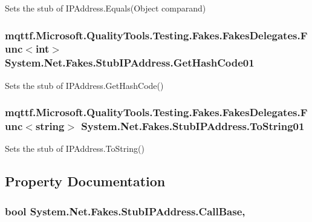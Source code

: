Sets the stub of I\-P\-Address.\-Equals(\-Object comparand)

\hypertarget{class_system_1_1_net_1_1_fakes_1_1_stub_i_p_address_aceba873e006477af4e2333d71b3bee35}{
\subsubsection[{Get\-Hash\-Code01}]{\setlength{\rightskip}{0pt plus 5cm}mqttf.\-Microsoft.\-Quality\-Tools.\-Testing.\-Fakes.\-Fakes\-Delegates.\-Func$<$int$>$ System.\-Net.\-Fakes.\-Stub\-I\-P\-Address.\-Get\-Hash\-Code01}}\label{class_system_1_1_net_1_1_fakes_1_1_stub_i_p_address_aceba873e006477af4e2333d71b3bee35}


Sets the stub of I\-P\-Address.\-Get\-Hash\-Code()

\hypertarget{class_system_1_1_net_1_1_fakes_1_1_stub_i_p_address_a9ff5b99790eaf4065370a69b7b9a3c21}{
\subsubsection[{To\-String01}]{\setlength{\rightskip}{0pt plus 5cm}mqttf.\-Microsoft.\-Quality\-Tools.\-Testing.\-Fakes.\-Fakes\-Delegates.\-Func$<$string$>$ System.\-Net.\-Fakes.\-Stub\-I\-P\-Address.\-To\-String01}}\label{class_system_1_1_net_1_1_fakes_1_1_stub_i_p_address_a9ff5b99790eaf4065370a69b7b9a3c21}


Sets the stub of I\-P\-Address.\-To\-String()



\subsection{Property Documentation}
\hypertarget{class_system_1_1_net_1_1_fakes_1_1_stub_i_p_address_a2fd35145bd0b3875ef8c9c7e2fe1a9e5}{
\subsubsection[{Call\-Base}]{\setlength{\rightskip}{0pt plus 5cm}bool System.\-Net.\-Fakes.\-Stub\-I\-P\-Address.\-Call\-Base\hspace{0.3cm}{\ttfamily [get]}, {\ttfamily [set]}}}\label{class_system_1_1_net_1_1_fakes_1_1_stub_i_p_address_a2fd35145bd0b3875ef8c9c7e2fe1a9e5}


